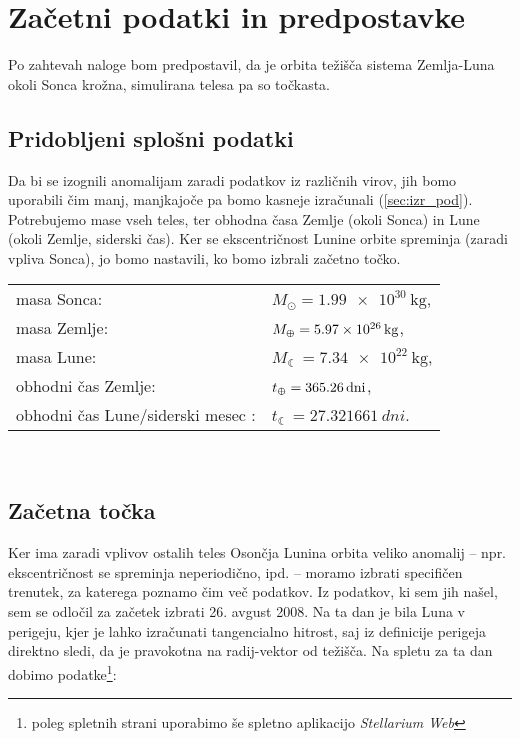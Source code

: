 \documentclass{article}
\begin{document}
\section{Začetni podatki in predpostavke}

Po zahtevah naloge bom predpostavil, da je orbita težišča sistema Zemlja-Luna okoli Sonca krožna, simulirana telesa pa so točkasta.
\subsection{Pridobljeni splošni podatki}

Da bi se izognili anomalijam zaradi podatkov iz različnih virov, jih bomo uporabili čim manj, manjkajoče pa bomo kasneje izračunali (\ref{sec:izr_pod}). Potrebujemo mase vseh teles, ter obhodna časa Zemlje (okoli Sonca) in Lune (okoli Zemlje, siderski čas). Ker se ekscentričnost Lunine orbite spreminja (zaradi vpliva Sonca), jo bomo nastavili, ko bomo izbrali začetno točko.

\begin{tabular}{@{$\bullet$\quad}ll}
    masa Sonca\cite{wiki:Sun}: & $M_\odot=\SI{1,99e30}{\kilo\gram}$,\\
    masa Zemlje\cite{wiki:Earth}: & $M_\varoplus=\SI{5.97e26}{\kilo\gram}$,\\
    masa Lune\cite{wiki:Moon}: & $M_\leftmoon=\SI{7.34e22}{\kilo\gram}$,\\
    obhodni čas Zemlje\cite{wiki:Earth}: & $t_\varoplus=\SI{365,26}{dni}$,\\
    obhodni čas Lune/siderski mesec \cite{wiki:Moon}: & $t_\leftmoon=\SI{27,321661}{dni}$.
\end{tabular}\\
\label{sec:pridob_pod}

\subsection{Začetna točka}

Ker ima zaradi vplivov ostalih teles Osončja Lunina orbita veliko anomalij -- npr. ekscentričnost se spreminja neperiodično, ipd. -- moramo izbrati specifičen trenutek, za katerega poznamo čim več podatkov. Iz podatkov, ki sem jih našel, sem se odločil za začetek izbrati 26. avgust 2008. Na ta dan je bila Luna v perigeju, kjer je lahko izračunati tangencialno hitrost, saj iz definicije perigeja direktno sledi, da je pravokotna na radij-vektor od težišča. Na spletu za ta dan dobimo podatke\footnote{poleg spletnih strani uporabimo še spletno aplikacijo \textit{Stellarium Web}}:
\end{document}
